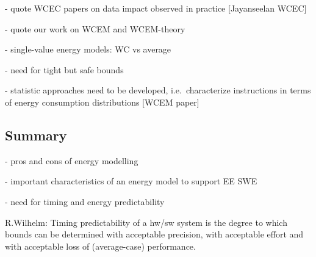 - quote WCEC papers on data impact observed in practice [Jayanseelan WCEC]

- quote our work on WCEM and WCEM-theory

- single-value energy models: WC vs average

- need for tight but safe bounds

- statistic approaches need to be developed, i.e.\ characterize instructions in terms of energy consumption distributions [WCEM paper]



\subsection{Summary}

- pros and cons of energy modelling

- important characteristics of an energy model to support EE SWE

- need for timing and energy predictability

R.Wilhelm: Timing predictability of a hw/sw system is the degree to which bounds can be determined with acceptable precision, with acceptable effort and with acceptable loss of (average-case) performance. 
